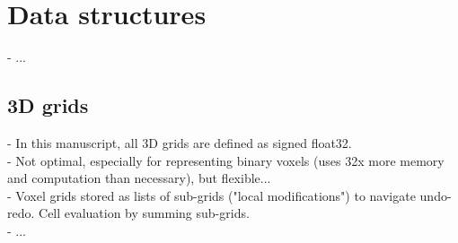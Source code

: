 \chapter{Data structures}
- ...

\section{3D grids}
- In this manuscript, all 3D grids are defined as signed float32. \\
- Not optimal, especially for representing binary voxels (uses 32x more memory and computation than necessary), but flexible... \\
- Voxel grids stored as lists of sub-grids ("local modifications") to navigate undo-redo. Cell evaluation by summing sub-grids. \\
- ...
